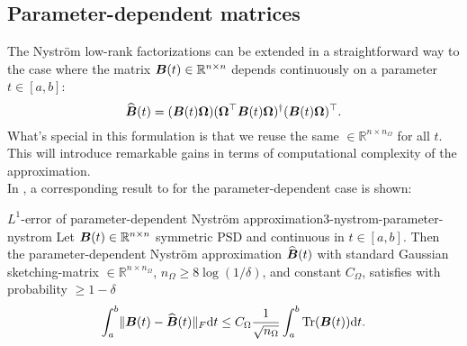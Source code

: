 \subsection{Parameter-dependent matrices}
\label{subsec:3-nystrom-factorization-parameter-matrices}

The Nystr\"om low-rank factorizations can be extended in a straightforward way
to the case where the matrix $\boldsymbol{B}(t) \in \mathbb{R}^{n \times n}$ depends
continuously on a parameter $t \in [a, b]$:
\begin{equation}
    \widehat{\boldsymbol{B}}(t) = (\boldsymbol{B}(t) \boldsymbol{\Omega}) (\boldsymbol{\Omega}^{\top} \boldsymbol{B}(t) \boldsymbol{\Omega})^{\dagger} (\boldsymbol{B}(t) \boldsymbol{\Omega})^{\top}.
    \label{equ:3-nystrom-nystrom-parameter}
\end{equation}
What's special in this formulation is that we reuse the same  $\in \mathbb{R}^{n \times n_{\Omega}}$
for all $t$. This will introduce remarkable gains in terms of computational
complexity of the approximation.\\

In \cite{he2023parameter}, a corresponding result to 
for the parameter-dependent case is shown:
\begin{lemma}{$L^1$-error of parameter-dependent Nystr\"om approximation}{3-nystrom-parameter-nystrom}
    Let $\boldsymbol{B}(t) \in \mathbb{R}^{n \times n}$ symmetric \gls{PSD} and
    continuous in $t \in [a, b]$. Then the parameter-dependent Nystr\"om approximation
    $\widehat{\boldsymbol{B}}(t)$  with standard
    Gaussian \gls{sketching-matrix} $\in \mathbb{R}^{n \times n_{\Omega}}$,
    $n_{\Omega} \geq 8 \log(1/\delta)$, and constant $C_{\Omega}$,
    satisfies with probability $\geq 1 - \delta$
    \begin{equation}
        \int_{a}^{b} \lVert \boldsymbol{B}(t) - \widehat{\boldsymbol{B}}(t) \rVert _F \mathrm{d}t \leq C_{\Omega} \frac{1}{\sqrt{n_{\Omega}}} \int_{a}^{b} \operatorname{Tr}(\boldsymbol{B}(t)) \mathrm{d}t.
    \end{equation}
\end{lemma}

